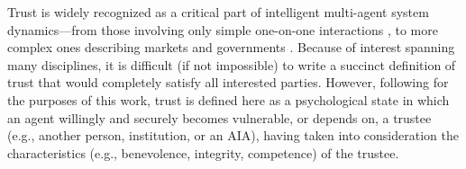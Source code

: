 
    Trust is widely recognized as a critical part of %
    intelligent multi-agent system dynamics---from those involving only simple one-on-one interactions \cite{Lewicki2006-hj}, to more complex ones describing markets and governments \cite{Fukuyama1995-un}. 
    Because of interest spanning many disciplines, it is difficult (if not impossible) to write a succinct definition of trust that would completely satisfy all interested parties. 
    However, following \cite{McKnight2004-vv} for the purposes of this work, trust is defined here as a psychological state in which an agent willingly and securely becomes vulnerable, or depends on, a trustee (e.g., another person, institution, or an AIA), having taken into consideration the characteristics (e.g., benevolence, integrity, competence) of the trustee. 

